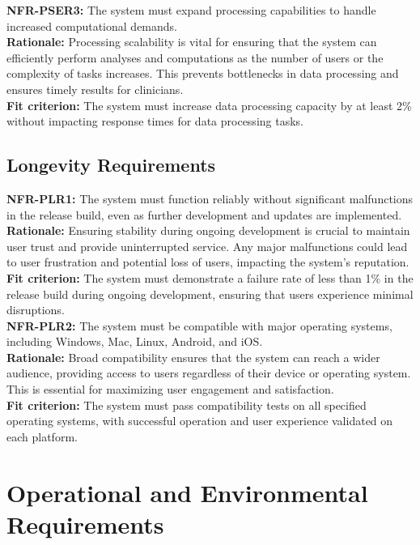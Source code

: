 \documentclass[12pt]{article}
\begin{document}
\noindent\textbf{NFR-PSER3: }The system must expand processing capabilities to handle increased computational demands.\\
\textbf{Rationale: }Processing scalability is vital for ensuring that the system can efficiently perform analyses and computations as the number of users or the complexity of tasks increases. This prevents bottlenecks in data processing and ensures timely results for clinicians.\\
\textbf{Fit criterion: }The system must increase data processing capacity by at least 2\% without impacting response times for data processing tasks.\\

\subsection{Longevity Requirements}

\noindent\textbf{NFR-PLR1: }The system must function reliably without significant malfunctions in the release build, even as further development and updates are implemented.\\
\textbf{Rationale: }Ensuring stability during ongoing development is crucial to maintain user trust and provide uninterrupted service. Any major malfunctions could lead to user frustration and potential loss of users, impacting the system's reputation.\\
\textbf{Fit criterion: }The system must demonstrate a failure rate of less than 1\% in the release build during ongoing development, ensuring that users experience minimal disruptions.\\

\noindent\textbf{NFR-PLR2: }The system must be compatible with major operating systems, including Windows, Mac, Linux, Android, and iOS.\\
\textbf{Rationale: }Broad compatibility ensures that the system can reach a wider audience, providing access to users regardless of their device or operating system. This is essential for maximizing user engagement and satisfaction.\\
\textbf{Fit criterion: }The system must pass compatibility tests on all specified operating systems, with successful operation and user experience validated on each platform.\\


\section{Operational and Environmental Requirements}
\end{document}
